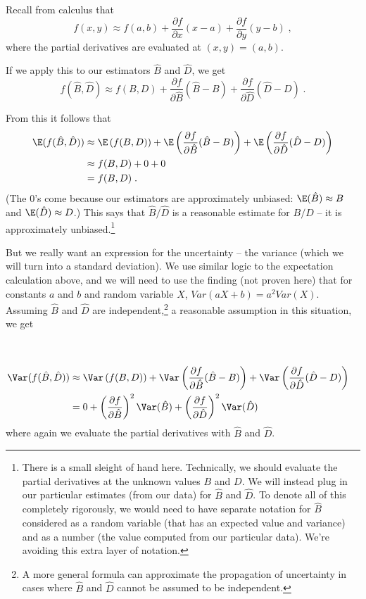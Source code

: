 \documentclass[twoside]{book}\usepackage[]{graphicx}\usepackage[]{xcolor}
\begin{document}
Recall from calculus that 
\[
f(x,y) \approx f(a, b)
+
\frac{\partial f}{\partial x} (x-a)
+
\frac{\partial f}{\partial y} (y-b) \;,
\]
where the partial derivatives are evaluated at $(x,y) = (a,b)$.

If we apply this to our estimators $\hat B$ and $\hat D$, we get
\[
f(\hat B,\hat D) \approx f( B, D ) 
+
\frac{\partial f}{\partial \hat B} (\hat B- B)
+
\frac{\partial f}{\partial \hat D} (\hat D- D)
\;.
\]

From this it follows that
\begin{align*}
	\E(f(\hat B,\hat D)) &\approx 
	\E\left(f( B, D)\right)
+
\E\left( \frac{\partial f}{\partial {\hat B}} (\hat B- B) \right)
+
\E\left( \frac{\partial f}{\partial \hat D} (\hat D- D) \right)
\\
&\approx f(B,D) + 0 + 0 
\\
&= f(B,D) \;.
\end{align*}
(The 0's come because our estimators are approximately unbiased: $\E(\hat B) \approx B$ and $\E(\hat D) \approx D$.)
This says that $\hat B/ \hat D$ is a reasonable estimate for $B/D$ -- it is approximately
unbiased.\footnote{There is a small sleight of hand here.  Technically, we should evaluate
the partial derivatives at the unknown values $B$ and $D$.  We will instead plug in our 
particular estimates (from our data) for $\hat B$ and $\hat D$.  To denote all of this 
completely rigorously, we would need to have separate notation for $\hat B$ considered
as a random variable (that has an expected value and variance) and as a number (the value
computed from our particular data).  We're avoiding this extra layer of notation.}

But we really want an expression for the uncertainty -- the variance (which we will turn into a standard deviation).  We use similar logic to the expectation calculation above, and we will need to use the finding (not proven here) that for constants $a$ and $b$ and random variable $X$, $Var(aX+b) = a^2 Var(X)$. Assuming $\hat B$ and $\hat D$ are independent,\footnote{A more general formula
can approximate the propagation of uncertainty in cases where $\hat B$ and $\hat D$ 
cannot be assumed to be independent.} a reasonable assumption in this situation,
we get
\begin{align*}
	\\[5mm]
\Var(f(\hat B,\hat D))
&\approx 
\Var\left(f( B, D)\right)
+
\Var\left( \frac{\partial f}{\partial \hat B} (\hat B - B) \right)
+
\Var\left( \frac{\partial f}{\partial \hat D} (\hat D - D) \right)
\\
&=
0 
+
\left(\frac{\partial f}{\partial \hat B}\right)^2 \Var(\hat B)
+
\left(\frac{\partial f}{\partial \hat D}\right)^2 \Var(\hat D)
\end{align*}
where again we evaluate the partial derivatives with $\hat{B}$ and $\hat{D}$.
\end{document}
